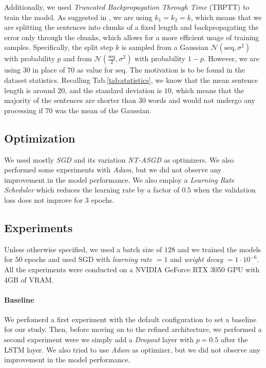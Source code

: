 Additionally, we used \emph{Truncated Backpropagation Through Time} (TBPTT) to train the model. As suggested in \cite{merity2017regularizing}, we are using $k_1 = k_2 = k$, which means that we are splitting the sentences into chunks of a fixed length and backpropagating the error only through the chunks, which allows for a more efficient usage of training samples. Specifically, the split step $k$ is sampled from a Gaussian $\mathcal{N}(\textrm{seq}, \sigma^2)$ with probability $p$ and from $\mathcal{N}(\frac{\textrm{seq}}{2}, \sigma^2)$ with probability $1-p$. However, we are using $30$ in place of $70$ as value for $\textrm{seq}$. The motivation is to be found in the dataset statistics. Recalling Tab.\ref{tab:statistics}, we know that the mean sentence length is around $20$, and the standard deviation is $10$, which means that the majority of the sentences are shorter than $30$ words and would not undergo any processing if $70$ was the mean of the Gaussian.

\subsection{Optimization}
We used mostly \emph{SGD} and its variation \emph{NT-ASGD}\cite{merity2017regularizing} as optimizers. We also performed some experiments with \emph{Adam}, but we did not observe any improvement in the model performance. We also employ a \emph{Learning Rate Scheduler} which reduces the learning rate by a factor of $0.5$ when the validation loss does not improve for $3$ epochs.

\subsection{Experiments}
Unless otherwise specified, we used a batch size of $128$ and we trained the models for $50$ epochs and used SGD with \emph{learning rate} $= 1$ and \emph{weight decay} $=1\cdot 10^{-6}$. All the experiments were conducted on a NVIDIA GeForce RTX 3050 GPU with 4GB of VRAM.
\paragraph*{Baseline} 
We perfomerd a first experiment with the default configuration to set a baseline for our study. Then, before moving on to the refined architecture, we performed a second experiment were we simply add a \emph{Dropout} layer with $p=0.5$ after the LSTM layer. We also tried to use \emph{Adam} as optimizer, but we did not observe any improvement in the model performance.
